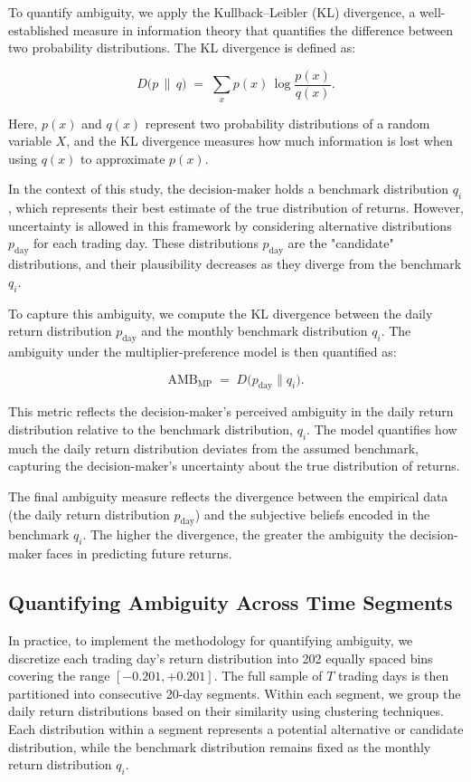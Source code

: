 \documentclass[preprint,12pt,authoryear]{elsarticle}
\begin{document}
To quantify ambiguity, we apply the Kullback–Leibler (KL) divergence, a well-established measure in information theory that quantifies the difference between two probability distributions. The KL divergence is defined as:

\[
D\bigl(p \,\|\, q\bigr) \;=\; \sum_{x} p(x)\,\log\!\frac{p(x)}{q(x)}.
\]

Here, \(p(x)\) and \(q(x)\) represent two probability distributions of a random variable \(X\), and the KL divergence measures how much information is lost when using \(q(x)\) to approximate \(p(x)\).

In the context of this study, the decision-maker holds a benchmark distribution \(q_i\), which represents their best estimate of the true distribution of returns. However, uncertainty is allowed in this framework by considering alternative distributions \(p_{\text{day}}\) for each trading day. These distributions \(p_{\text{day}}\) are the "candidate" distributions, and their plausibility decreases as they diverge from the benchmark \(q_i\). 

To capture this ambiguity, we compute the KL divergence between the daily return distribution \(p_{\text{day}}\) and the monthly benchmark distribution \(q_i\). The ambiguity under the multiplier-preference model is then quantified as:

\[
\mathrm{AMB}_{\mathrm{MP}} \;=\; D\bigl(p_{\mathrm{day}} \parallel q_i\bigr).
\]

This metric reflects the decision-maker’s perceived ambiguity in the daily return distribution relative to the benchmark distribution, \(q_i\). The model quantifies how much the daily return distribution deviates from the assumed benchmark, capturing the decision-maker's uncertainty about the true distribution of returns.

The final ambiguity measure reflects the divergence between the empirical data (the daily return distribution \(p_{\text{day}}\)) and the subjective beliefs encoded in the benchmark \(q_i\). The higher the divergence, the greater the ambiguity the decision-maker faces in predicting future returns.

\subsection{Quantifying Ambiguity Across Time Segments}

In practice, to implement the methodology for quantifying ambiguity, we discretize each trading day's return distribution into 202 equally spaced bins covering the range \([-0.201, +0.201]\). The full sample of \(T\) trading days is then partitioned into consecutive 20-day segments. Within each segment, we group the daily return distributions based on their similarity using clustering techniques. Each distribution within a segment represents a potential alternative or candidate distribution, while the benchmark distribution remains fixed as the monthly return distribution \(q_i\).
\end{document}
